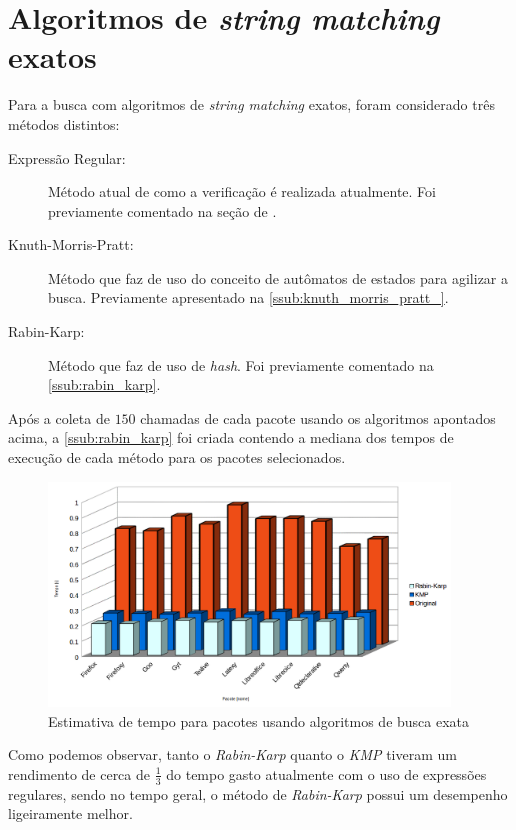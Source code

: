 
\section{\nmu Algoritmos de \textit{string matching} exatos} %
\label{sec:algor_timos_de_string_matching_exatos}

Para a busca com algoritmos de \textit{string matching} exatos, foram considerado três métodos distintos:

\begin{description}
	\item[Expressão Regular:] Método atual de como a verificação é realizada atualmente. Foi previamente comentado na seção de .
	\item[Knuth-Morris-Pratt:] Método que faz de uso do conceito de autômatos de estados para agilizar a busca. Previamente apresentado na \autoref{ssub:knuth_morris_pratt_}.
	\item[Rabin-Karp:]  Método que faz de uso de \textit{hash}. Foi previamente comentado na \autoref{ssub:rabin_karp}.
\end{description}

Após a coleta de $150$ chamadas de cada pacote usando os algoritmos apontados acima, a \autoref{ssub:rabin_karp} foi criada contendo a mediana dos tempos de execução de cada método para os pacotes selecionados.

\begin{figure}[htbp]
  \centering
  \includegraphics[width=0.95\textwidth]{figuras/tempo-rk_kmp_std}
  \caption{Estimativa de tempo para pacotes usando algoritmos de busca exata}
  \label{tempo_rk_kmp_std}
\end{figure}

Como podemos observar, tanto o \textit{Rabin-Karp} quanto o \textit{KMP} tiveram um rendimento de cerca de $\frac{1}{3}$ do tempo gasto atualmente com o uso de expressões regulares, sendo no tempo geral, o método de \textit{Rabin-Karp} possui um desempenho ligeiramente melhor.


